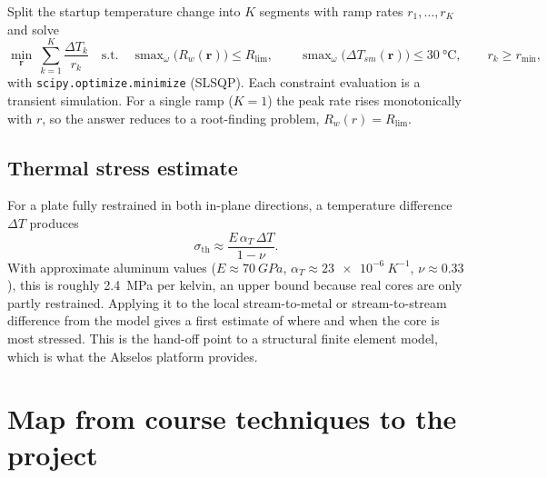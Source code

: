 \documentclass[11pt]{article}
\newcommand{\smax}{\operatorname{smax}}
\begin{document}
Split the startup temperature change into $K$ segments with ramp rates $r_1,\dots,r_K$ and solve
\begin{equation}
  \min_{\bm r}\ \sum_{k=1}^{K}\frac{\Delta T_k}{r_k}
  \quad\text{s.t.}\quad
  \smax_\omega\!\big(R_w(\bm r)\big) \le R_{\lim},
  \qquad
  \smax_\omega\!\big(\Delta T_{sm}(\bm r)\big) \le \SI{30}{\celsius},
  \qquad
  r_k \ge r_{\min},
\end{equation}
with \texttt{scipy.optimize.minimize} (SLSQP). Each constraint evaluation is a transient simulation. For a single ramp ($K = 1$) the peak rate rises monotonically with $r$, so the answer reduces to a root-finding problem, $R_w(r) = R_{\lim}$.

\subsection{Thermal stress estimate}

For a plate fully restrained in both in-plane directions, a temperature difference $\Delta T$ produces
\begin{equation}
  \sigma_{\mathrm{th}} \approx \frac{E\,\alpha_T\,\Delta T}{1 - \nu}.
\end{equation}
With approximate aluminum values ($E \approx \SI{70}{GPa}$, $\alpha_T \approx \SI{23e-6}{K^{-1}}$, $\nu \approx 0.33$), this is roughly \SI{2.4}{MPa} per kelvin, an upper bound because real cores are only partly restrained. Applying it to the local stream-to-metal or stream-to-stream difference from the model gives a first estimate of where and when the core is most stressed. This is the hand-off point to a structural finite element model, which is what the Akselos platform provides.

\section{Map from course techniques to the project}
\end{document}
